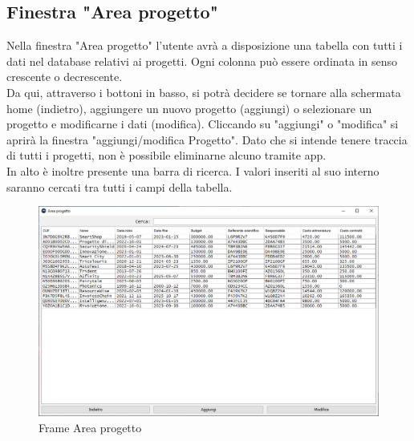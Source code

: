         \subsection {Finestra "Area progetto"}
            Nella finestra "Area progetto" l'utente avrà a disposizione una tabella con tutti i dati nel database relativi ai progetti. Ogni colonna può essere ordinata in senso crescente o decrescente.\\
            Da qui, attraverso i bottoni in basso, si potrà decidere se tornare alla schermata home (indietro), aggiungere un nuovo progetto (aggiungi) o selezionare un progetto e modificarne i dati (modifica). Cliccando su "aggiungi" o "modifica" si aprirà la finestra "aggiungi/modifica Progetto". Dato che si intende tenere traccia di tutti i progetti, non è possibile eliminarne alcuno tramite app.\\
            In alto è inoltre presente una barra di ricerca. I valori inseriti al suo interno saranno cercati tra tutti i campi della tabella.
            \begin{figure}[htbp!]
                \centering
                    \vspace{2\baselineskip}
                    \includegraphics[width=0.9\linewidth]{Immagini/Frames/Frame Area/Frame Area progetto.png}
                \caption{Frame Area progetto}
                \label{fig:Frame Area progetto}
            \end{figure}

    \newpage

